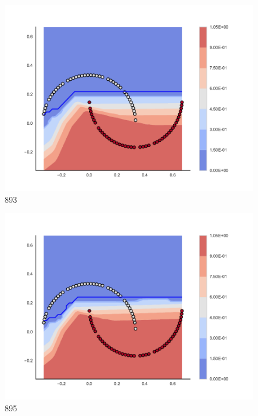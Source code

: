 \begin{subfigure}[b]{0.09\textwidth}
    \includegraphics[clip, trim=2.35cm 1.75cm 4.5cm 0cm,width=\textwidth]{img/convergence/893.pdf}
    \caption{893}
    \label{fig:convergence_893}
\end{subfigure}
%
\begin{subfigure}[b]{0.09\textwidth}
    \includegraphics[clip, trim=2.35cm 1.75cm 4.5cm 0cm,width=\textwidth]{img/convergence/895.pdf}
    \caption{895}
    \label{fig:convergence_895}
\end{subfigure}
%
